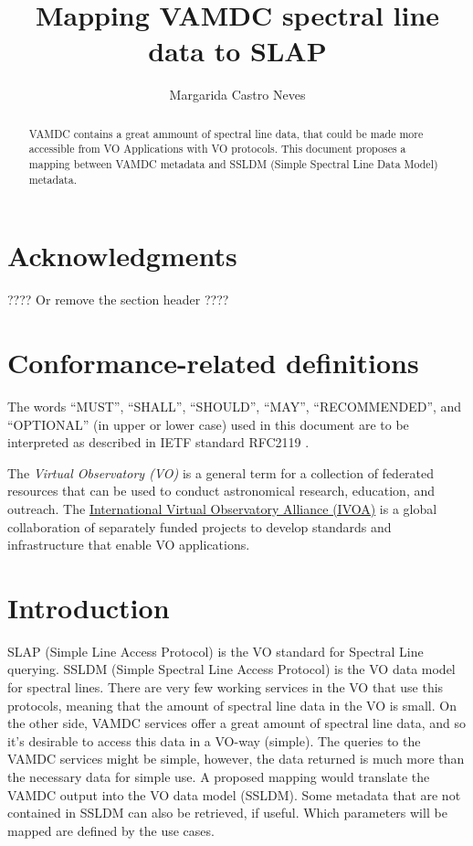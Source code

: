 \documentclass[11pt,a4paper]{ivoa}
\title{Mapping VAMDC spectral line data to SLAP}
\author{Margarida Castro Neves}
\begin{document}
\begin{abstract}
VAMDC contains  a great ammount of spectral line data, that could be made more
accessible from VO Applications with  VO protocols. This document proposes a mapping
between VAMDC metadata and SSLDM (Simple Spectral Line Data Model) metadata.
\end{abstract}


\section*{Acknowledgments}

???? Or remove the section header ????

\section*{Conformance-related definitions}

The words ``MUST'', ``SHALL'', ``SHOULD'', ``MAY'', ``RECOMMENDED'', and
``OPTIONAL'' (in upper or lower case) used in this document are to be
interpreted as described in IETF standard RFC2119 \citep{std:RFC2119}.

The \emph{Virtual Observatory (VO)} is a
general term for a collection of federated resources that can be used
to conduct astronomical research, education, and outreach.
The \href{http://www.ivoa.net}{International
Virtual Observatory Alliance (IVOA)} is a global
collaboration of separately funded projects to develop standards and
infrastructure that enable VO applications.


\section{Introduction}

SLAP (Simple Line Access Protocol) is the VO standard for Spectral Line querying. 
SSLDM (Simple Spectral Line Access Protocol) is the VO data model for spectral lines.
There are very few working services in the VO that use this protocols, meaning that the
amount of spectral line data in the VO is small. 
On the other side, VAMDC services offer a great amount of spectral line data, and 
so it's desirable to access this data in a VO-way (simple). 
The queries to the VAMDC services might be simple, however, the data returned is much more
than the necessary data for simple use.
A proposed mapping would translate the VAMDC output into the  VO data model (SSLDM). Some metadata that are not contained in SSLDM can also be retrieved, if useful. 
Which parameters  will be mapped are defined by the use cases.
\end{document}
